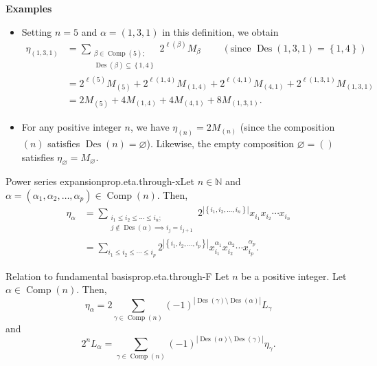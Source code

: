 \documentclass[numbers=enddot,12pt,final,onecolumn,notitlepage]{scrartcl}%
\newcommand{\NN}{\mathbb{N}} %
\newcommand{\Des}{\operatorname{Des}}
\newcommand{\Comp}{\operatorname{Comp}}
\newcommand{\tup}[1]{\left( #1 \right)}
\newcommand{\0}{\phantom{c}}
\let\sumnonlimits\sum
\renewcommand{\sum}{\sumnonlimits\limits}
\begin{document}
\textbf{Examples}
\begin{itemize}
\item Setting $n=5$ and $\alpha=\left(  1,3,1\right)  $ in this
definition, we obtain%
\begin{align*}
\eta_{\left(  1,3,1\right)  }  &  =\sum_{\substack{\beta
\in \Comp(5);\\\Des\left(  \beta\right)  \subseteq
\left\{  1,4\right\}  }}2^{\ell\left(  \beta\right)  }M_{\beta}%
\ \ \ \ \ \ \ \ \ \ \left(\text{since }\Des\left(  1,3,1\right)  =\left\{
1,4\right\}  \right) \\
&  =2^{\ell\left(  5\right)  }M_{\left(  5\right)  }+2^{\ell\left(
1,4\right)  }M_{\left(  1,4\right)  }+2^{\ell\left(  4,1\right)  }M_{\left(
4,1\right)  }+2^{\ell\left(  1,3,1\right)  }M_{\left(  1,3,1\right)  }%
\\
&=2M_{\left(  5\right)  }+4M_{\left(  1,4\right)
}+4M_{\left(  4,1\right)  }+8M_{\left(  1,3,1\right)  }.
\end{align*}


\item For any positive integer $n$, we have $\eta_{\left(  n\right)
}=2M_{\left(  n\right)  }$
(since the composition $\left(n\right)$ satisfies
$\Des\left(n\right) = \varnothing$).
Likewise, the empty composition $\varnothing
=\left(  {}\right)  $ satisfies $\eta_{\varnothing}=M_{\varnothing}$.

\end{itemize}

\begin{proposition}{Power series expansion}{prop.eta.through-x}Let $n\in\NN$ and $\alpha=\left(  \alpha_{1},\alpha_{2}%
,\ldots,\alpha_{p}\right) \in
\Comp(n)$. Then,
\begin{align*}
\eta_{\alpha}
&=\sum_{\substack{i_{1}\leq i_{2}\leq\cdots\leq
i_{n}  ;\\j \notin \Des(\alpha) \implies i_j=i_{j+1}}}
2^{\left\vert \left\{  i_{1},i_{2}%
,\ldots,i_{n}\right\}  \right\vert }x_{i_{1}}x_{i_{2}}\cdots x_{i_{n}}
\\
&=\sum_{i_{1}\leq i_{2}\leq\cdots\leq i_{p}}2^{\left\vert \left\{
i_{1},i_{2},\ldots,i_{p}\right\}  \right\vert }x_{i_{1}}^{\alpha_{1}}x_{i_{2}%
}^{\alpha_{2}}\cdots x_{i_{p}}^{\alpha_{p}}.
\end{align*}
\end{proposition}

\begin{proposition}{Relation to fundamental basis}{prop.eta.through-F}
Let $n$ be a positive integer. Let $\alpha \in \Comp(n)$. Then,
\[
\eta_{\alpha}=2\sum_{\gamma\in \Comp(n)}\left(
-1\right)  ^{\left\vert \Des\left(  \gamma\right)  \setminus \Des\left(
\alpha\right)  \right\vert }L_{\gamma}
\]
and
\[
2^n L_\alpha = \sum_{\gamma \in \Comp(n)}
\tup{-1}^{\left\vert \Des\left(  \alpha\right)  \setminus \Des\left(
\gamma\right)  \right\vert }\eta_{\gamma} .
\]
\end{proposition}
\end{document}
